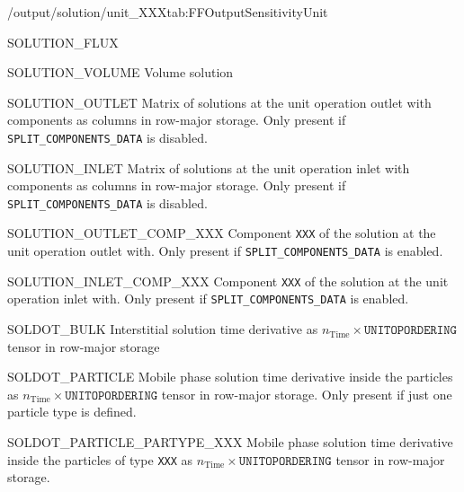 \begin{groupscope}{/output/solution/unit\_XXX}{tab:FFOutputSensitivityUnit}
\begin{dataset}[type=double,unit={\si{\mol\per\square\metre\per\second}}]{SOLUTION\_FLUX}
  \end{dataset}
  \begin{dataset}[type=double,unit={\si{\cubic\metre}}]{SOLUTION\_VOLUME}
    Volume solution
  \end{dataset}
  \begin{dataset}[type=double,unit={\si{\mol\per\cubic\metre\of{IV}}}]{SOLUTION\_OUTLET}
    Matrix of solutions at the unit operation outlet with components as columns in row-major storage.
    Only present if \texttt{SPLIT\_COMPONENTS\_DATA} is disabled.
  \end{dataset}
  \begin{dataset}[type=double,unit={\si{\mol\per\cubic\metre\of{IV}}}]{SOLUTION\_INLET}
    Matrix of solutions at the unit operation inlet with components as columns in row-major storage.
    Only present if \texttt{SPLIT\_COMPONENTS\_DATA} is disabled.
  \end{dataset}
  \begin{dataset}[type=double,unit={\si{\mol\per\cubic\metre\of{IV}}}]{SOLUTION\_OUTLET\_COMP\_XXX}
    Component \texttt{XXX} of the solution at the unit operation outlet with.
    Only present if \texttt{SPLIT\_COMPONENTS\_DATA} is enabled.
  \end{dataset}
  \begin{dataset}[type=double,unit={\si{\mol\per\cubic\metre\of{IV}}}]{SOLUTION\_INLET\_COMP\_XXX}
    Component \texttt{XXX} of the solution at the unit operation inlet with.
    Only present if \texttt{SPLIT\_COMPONENTS\_DATA} is enabled.
  \end{dataset}
  \begin{dataset}[type=double,unit={\si{\mol\per\cubic\metre\of{IV}\per\second}}]{SOLDOT\_BULK}
    Interstitial solution time derivative as $n_{\text{Time}} \times \texttt{UNITOPORDERING}$ tensor in row-major storage
  \end{dataset}
  \begin{dataset}[type=double,unit={\si{\mol\per\cubic\metre\of{MP}\per\second}}]{SOLDOT\_PARTICLE}
    Mobile phase solution time derivative inside the particles as $n_{\text{Time}} \times \texttt{UNITOPORDERING}$ tensor in row-major storage.
    Only present if just one particle type is defined.
  \end{dataset}
  \begin{dataset}[type=double,unit={\si{\mol\per\cubic\metre\of{MP}\per\second}}]{SOLDOT\_PARTICLE\_PARTYPE\_XXX}
    Mobile phase solution time derivative inside the particles of type \texttt{XXX} as $n_{\text{Time}} \times \texttt{UNITOPORDERING}$ tensor in row-major storage.

\end{dataset}
\end{groupscope}

